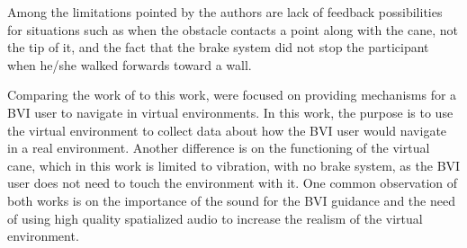 Among the limitations pointed by the authors are lack of feedback possibilities for situations such as when the obstacle contacts a point along with the cane, not the tip of it, and the fact that the brake system did not stop the participant when he/she walked forwards toward a wall.

Comparing the work of  to this work,  were focused on providing mechanisms for a BVI user to navigate in virtual environments. In this work, the purpose is to use the virtual environment to collect data about how the BVI user would navigate in a real environment. Another difference is on the functioning of the virtual cane, which in this work is limited to vibration, with no brake system, as the BVI user does not need to touch the environment with it. One common observation of both works is on the importance of the sound for the BVI guidance and the need of using high quality spatialized audio to increase the realism of the virtual environment.
